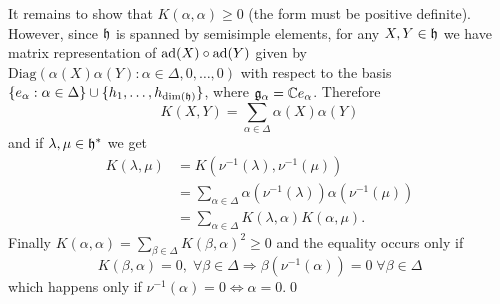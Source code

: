 It remains to show that $K(\alpha,\alpha)\geq0$ (the form must be positive definite). However, 
since $\mathfrak{h}$ is spanned by semisimple elements, for any $X,Y\in\mathfrak{h}$ we have matrix representation 
of $\text{ad}(X)\circ \text{ad}(Y)$ given by $\text{Diag}(\alpha(X)\alpha(Y):\alpha\in\Delta, 0,\dots,0)$ with respect to the basis
$\{e_{\alpha}:\alpha\in\Delta\}\cup \{h_1,\dots, h_{\dim(\mathfrak{h})}\}$, where $\mathfrak{g}_\alpha=\mathbb{C} e_\alpha$. Therefore
\begin{equation}
    K(X,Y)=\sum_{\alpha\in\Delta}\alpha(X)\alpha(Y)
\end{equation}
and if $\lambda,\mu\in\mathfrak{h}^*$ we get 
\begin{equation}
    \begin{split}
        K(\lambda,\mu) &=K(\nu^{-1}(\lambda),\nu^{-1}(\mu))\\
         &=\sum_{\alpha\in\Delta}\alpha(\nu^{-1}(\lambda))\alpha(\nu^{-1}(\mu))\\
         &=\sum_{\alpha\in\Delta}K(\lambda,\alpha)K(\alpha,\mu).
    \end{split}
\end{equation}
Finally $K(\alpha,\alpha)=\sum_{\beta\in\Delta}K(\beta,\alpha)^2\geq0$ and the equality occurs only if 
\begin{equation}
    K(\beta,\alpha)=0,\;\forall\beta\in\Delta\Rightarrow \beta(\nu^{-1}(\alpha))=0\;\forall\beta\in\Delta
\end{equation}
which happens only if $\nu^{-1}(\alpha)=0\iff \alpha=0$.\qed

